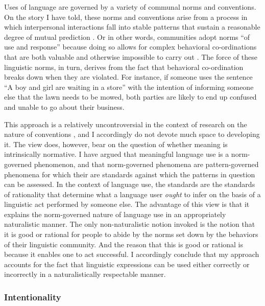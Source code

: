 Uses of language are governed by a variety of communal norms and conventions. On the story I have told, these norms and conventions arise from a process in which interpersonal interactions fall into stable patterns that sustain a reasonable degree of mutual prediction \citep{clark:2013}. Or in other words, communities adopt norms ``of use and response'' because doing so allows for complex behavioral co-ordinations that are both valuable and otherwise impossible to carry out \citep[][p. 50]{Millikan:2005}. The force of these linguistic norms, in turn, derives from the fact that behavioral co-ordination breaks down when they are violated. For instance, if someone uses the sentence ``A boy and girl are waiting in a store'' with the intention of informing someone else that the lawn needs to be mowed, both parties are likely to end up confused and unable to go about their business.

This approach is a relatively uncontroversial in the context of research on the nature of conventions \citep{Millikan:2005,Lewis:1975,Lewis:1969}, and I accordingly do not devote much space to developing it. The view does, however, bear on the question of whether meaning is intrinsically normative. I have argued that meaningful language use is a norm-governed phenomenon, and that norm-governed phenomena are pattern-governed phenomena for which their are standards against which the patterns in question can be assessed. In the context of language use, the standards are the standards of rationality that determine what a language user \textit{ought} to infer on the basis of a linguistic act performed by someone else. The advantage of this view is that it explains the norm-governed nature of language use in an appropriately naturalistic manner. The only non-naturalistic notion invoked is the notion that it is good or rational for people to abide by the norms set down by the behaviors of their linguistic community. And the reason that this is good or rational is because it enables one to act successful. I accordingly conclude that my approach accounts for the fact that linguistic expressions can be used either correctly or incorrectly in a naturalistically respectable manner. 

\subsubsection{Intentionality}

